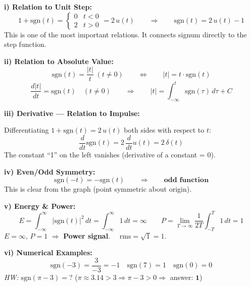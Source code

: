 \documentclass[10pt,a4paper]{article}
\begin{document}
\begin{propbox}
\textbf{i) Relation to Unit Step:}
\[
1 + \mathrm{sgn}(t) = \begin{cases}0 & t < 0\\ 2 & t > 0\end{cases} = 2\,u(t)
\qquad \Rightarrow \qquad \boxed{\mathrm{sgn}(t) = 2\,u(t) - 1}
\]
This is one of the most important relations. It connects signum directly to the step function.

\begin{center}
\end{center}

\smallskip
\textbf{ii) Relation to Absolute Value:}
\[
\mathrm{sgn}(t) = \frac{|t|}{t}\;(t\neq0) \qquad \Leftrightarrow \qquad |t| = t\cdot\mathrm{sgn}(t)
\]
\[
\frac{d|t|}{dt} = \mathrm{sgn}(t) \quad (t\neq0) \qquad \Rightarrow \qquad |t| = \int_{-\infty}^{t}\mathrm{sgn}(\tau)\,d\tau + C
\]

\textbf{iii) Derivative --- Relation to Impulse:}

Differentiating $1 + \mathrm{sgn}(t) = 2\,u(t)$ both sides with respect to $t$:
\[
\frac{d}{dt}\mathrm{sgn}(t) = 2\,\frac{d}{dt}u(t) = 2\,\delta(t)
\]
The constant ``1'' on the left vanishes (derivative of a constant = 0).

\textbf{iv) Even/Odd Symmetry:}
\[
\mathrm{sgn}(-t) = -\mathrm{sgn}(t) \qquad \Rightarrow \qquad \textbf{odd function}
\]
This is clear from the graph (point symmetric about origin).

\textbf{v) Energy \& Power:}
\[
E = \int_{-\infty}^{\infty}|\mathrm{sgn}(t)|^2\,dt = \int_{-\infty}^{\infty}1\,dt = \infty
\qquad P = \lim_{T\to\infty}\frac{1}{2T}\int_{-T}^{T}1\,dt = 1
\]
$E = \infty$, $P = 1$ $\Rightarrow$ \textbf{Power signal}. $\quad \text{rms} = \sqrt{1} = 1$.

\textbf{vi) Numerical Examples:}
\[
\mathrm{sgn}(-3) = \frac{3}{-3} = -1 \quad \mathrm{sgn}(7) = 1 \quad \mathrm{sgn}(0) = 0
\]
\textit{HW:} $\mathrm{sgn}(\pi - 3) = ?$ \quad ($\pi \approx 3.14 > 3 \Rightarrow \pi-3 > 0 \Rightarrow$ answer: $\mathbf{1}$)
\end{propbox}
\end{document}
